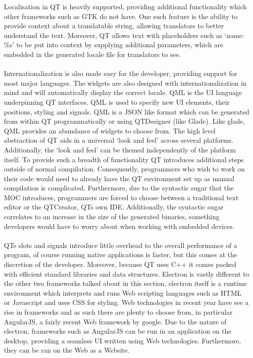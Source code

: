   Localisation in QT is heavily supported, providing additional functionality which other frameworks such as GTK do not have\cite{qt_localisation}. One such feature is the ability to provide context about a translatable string, allowing translators to better understand the text. Moreover, QT allows text with placeholders such as `name: \%s' to be put into context by supplying additional parameters, which are embedded in the generated locale file for translators to see. \\\\
  Internationalization is also made easy for the developer, providing support for most major languages\cite{qt_international}. The widgets are also designed with internationalization in mind and will automatically display the correct locale.
  QML is the UI language underpinning QT interfaces\cite{qt_qml}. QML is used to specify new UI elements, their positions, styling and signals. QML is a JSON like format which can be generated from within QT programmatically or using QTDesigner (like Glade). Like glade, QML provides an abundance of widgets to choose from. The high level abstraction of QT aids in a universal `look and feel' across several platforms. Additionally, the `look and feel' can be themed independently of the platform itself.
  To provide such a breadth of functionality QT introduces additional steps outside of normal compilation. Consequently, programmers who wish to work on their code would need to already have the QT environment set up as manual compilation is complicated. Furthermore, due to the syntactic sugar that the MOC introduces, programmers are forced to choose between a traditional text editor or the QTCreator, QTs own IDE. Additionally,
  the syntactic sugar correlates to an increase in the size of the generated binaries, something developers would have to worry about when working with embedded devices.\\\\
  QTs slots and signals introduce little overhead to the overall performance of a program, of course running native applications is faster, but this comes at the discretion of the developer. Moreover, because QT uses C++ it comes packed with efficient standard libraries and data structures.
Electron is vastly different to the other two frameworks talked about in this section, electron itself is a runtime environment which interprets and runs Web scripting languages such as HTML or Javascript and uses CSS for styling\cite{electron}. Web technologies in recent year have see a rise in frameworks and as such there are plenty to choose from, in particular AngularJS, a fairly recent Web framework by google. Due to the nature of electron, frameworks such as AngularJS can be run in an application on the desktop, providing a seamless UI written using Web technologies. Furthermore, they can be ran on the Web as a Website.
